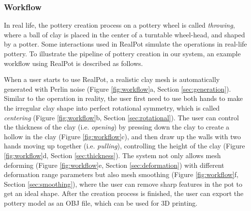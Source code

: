 \documentclass{svjour3}                     %
\begin{document}
\subsubsection{Workflow}
\label{sec:workflow}
In real life, the pottery creation process on a pottery wheel is called \textit{throwing}, where a ball of clay is placed in the center of a turntable wheel-head, and shaped by a potter.
{\color{blue}Some interactions used in RealPot simulate the operations in real-life pottery.}
To illustrate the pipeline of pottery creation in our system, an example workflow using RealPot is described as follows.

When a user starts to use RealPot, a realistic clay mesh is automatically generated with Perlin noise (Figure \ref{fig:workflow}a, Section \ref{sec:generation}). 
Similar to the operation in reality, the user first need to use both hands to make the irregular clay shape into perfect rotational symmetry, which is called \textit{centering} (Figure \ref{fig:workflow}b, Section \ref{sec:rotational}).
The user can control the thickness of the clay (i.e. \textit{opening}) by pressing down the clay to create a hollow in the clay (Figure \ref{fig:workflow}c), 
and then draw up the walls with two hands moving up together (i.e. \textit{pulling}), controlling the height of the clay (Figure \ref{fig:workflow}d, Section \ref{sec:thickness}).
The system not only allows mesh deforming (Figure \ref{fig:workflow}e, Section \ref{sec:deformation}) with different deformation range parameters but also mesh smoothing (Figure \ref{fig:workflow}f, Section \ref{sec:smoothing}), where the user can remove sharp features in the pot to get an ideal shape.
After the creation process is finished, the user can export the pottery model as an OBJ file, which can be used for 3D printing.
\end{document}
